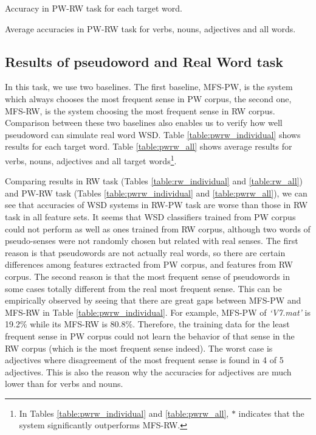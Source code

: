 \documentclass[english]{jnlp_1.4}
\begin{document}
\begin{table}[t]
\caption{Accuracy in PW-RW task for each target word.}
\label{table:pwrw_individual}

\vspace*{-0.5\Cvs}
\end{table}
\begin{table}[t]
\caption{Average accuracies in PW-RW task for verbs, nouns, adjectives and all words.}
\label{table:pwrw_all}

\vspace*{-0.5\Cvs}
\end{table}

\subsection{Results of pseudoword and Real Word task}
\label{exp_pwrw}
In this task, we use two baselines. 
The first baseline, MFS-PW, is the system which always chooses the most frequent sense in PW corpus, the second one, MFS-RW, is the system choosing the most frequent sense in RW corpus. 
Comparison between these two baselines also enables us to verify how well pseudoword can simulate real word WSD.
Table \ref{table:pwrw_individual} shows results for each target word.
Table \ref{table:pwrw_all} shows average results for verbs, nouns, adjectives and all target words\footnote{In Tables \ref{table:pwrw_individual} and \ref{table:pwrw_all}, $*$ indicates that the system significantly outperforms MFS-RW.}.



Comparing results in RW task (Tables \ref{table:rw_individual} and \ref{table:rw_all}) and PW-RW task (Tables \ref{table:pwrw_individual} and \ref{table:pwrw_all}), 
we can see that accuracies of WSD systems in RW-PW task are worse than those in RW task in all feature sets.
It seems that WSD classifiers trained from PW corpus could not perform as well as ones trained from RW corpus,
although two words of pseudo-senses were not randomly chosen but related with real senses.
The first reason is that pseudowords are not actually real words, 
so there are certain differences among features extracted from PW corpus, and features from RW corpus. 
The second reason is that the most frequent sense of pseudowords in some cases totally different from the real most frequent sense.
This can be empirically observed by seeing that there are great gaps between MFS-PW and MFS-RW in Table \ref{table:pwrw_individual}. 
For example, MFS-PW of \textit{`V7.mat'} is 19.2\% while its MFS-RW is 80.8\%.
Therefore, the training data for the least frequent sense in PW corpus could not learn the behavior of that sense in the RW corpus (which is the most frequent sense indeed).
The worst case is adjectives where disagreement of the most frequent sense is found in 4 of 5 adjectives. 
This is also the reason why the accuracies for adjectives are much lower than for verbs and nouns.
\end{document}
